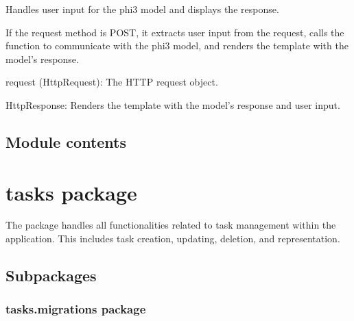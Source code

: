 \documentclass[letterpaper,10pt,english]{sphinxmanual}
\begin{document}
\begin{fulllineitems}
\label{\detokenize{open_ai:open_ai.views.chatphi}}
\pysigstartsignatures
{}
\pysigstopsignatures
\sphinxAtStartPar
Handles user input for the phi3 model and displays the response.

\sphinxAtStartPar
If the request method is POST, it extracts user input from the request, calls the 
function to communicate with the phi3 model, and renders the  template with the model’s response.
\begin{description}
\sphinxAtStartPar
request (HttpRequest): The HTTP request object.

\sphinxAtStartPar
HttpResponse: Renders the  template with the model’s response and user input.

\end{description}

\end{fulllineitems}



\section{Module contents}
\label{\detokenize{open_ai:module-open_ai}}\label{\detokenize{open_ai:module-contents}}
\sphinxstepscope


\chapter{tasks package}
\label{\detokenize{tasks:tasks-package}}\label{\detokenize{tasks::doc}}
\sphinxAtStartPar
The  package handles all functionalities related to task management within the application. This includes task creation, updating, deletion, and representation.


\section{Subpackages}
\label{\detokenize{tasks:subpackages}}
\sphinxstepscope


\subsection{tasks.migrations package}
\label{\detokenize{tasks.migrations:tasks-migrations-package}}\label{\detokenize{tasks.migrations::doc}}
\end{document}
